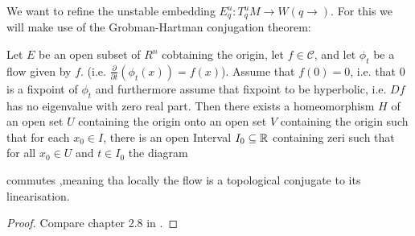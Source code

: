 We want to refine the unstable embedding $E^u_q:T^u_qM\to W(q\to)$. For this we will make use of the  Grobman-Hartman conjugation theorem:
\begin{theorem}
	Let $E$ be an open subset of $R^n$ cobtaining the origin, let $f\in \mathcal{C}$, and let $\phi_t$ be a flow given by $f$. (i.e. $\frac{\partial}{\partial t} (\phi_t(x))=f(x)$). Assume that $f(0)=0$, i.e. that $0$ is a fixpoint of $\phi_t$ and furthermore assume that fixpoint to be hyperbolic, i.e. $Df$ has no eigenvalue with zero real part. Then there exists a homeomorphism $H$ of an open set $U$ containing the origin onto an open set $V$ containing the origin such that for each $x_0\in I$, there is an open Interval $I_0\subseteq  \mathbb{R}$ containing zeri such that for all $x_0\in U$ and $t\in I_0$ the diagram
	\begin{center}
	\end{center}  commutes ,meaning tha locally the flow is a topological conjugate to its linearisation.
\end{theorem}
\begin{proof}Compare chapter 2.8 in \cite{Perko2001}.
\end{proof}



